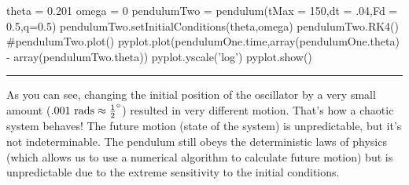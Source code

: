 \begin{codeexample}
\begin{VerbatimOut}{\listingFile}
theta = 0.201
omega = 0
pendulumTwo = pendulum(tMax = 150,dt = .04,Fd = 0.5,q=0.5)
pendulumTwo.setInitialConditions(theta,omega)
pendulumTwo.RK4()
#pendulumTwo.plot()
pyplot.plot(pendulumOne.time,array(pendulumOne.theta) - array(pendulumTwo.theta))
pyplot.yscale('log')
pyplot.show()
\end{VerbatimOut}
\end{codeexample}
\else
\noindent\rule{4 in}{0.01 in}
\fi


As you can see, changing the initial position of the oscillator by a
very small amount ($.001 \mathrm{~rads} \approx {1\over 2}^\circ$) resulted in
very different motion.  That's how a chaotic system behaves!  The future motion (state of
the system) is unpredictable, but it's not indeterminable.  The
pendulum still obeys the deterministic laws of physics (which allows
us to use a numerical algorithm to calculate future motion) but is
unpredictable due to the extreme sensitivity to the initial
conditions.


